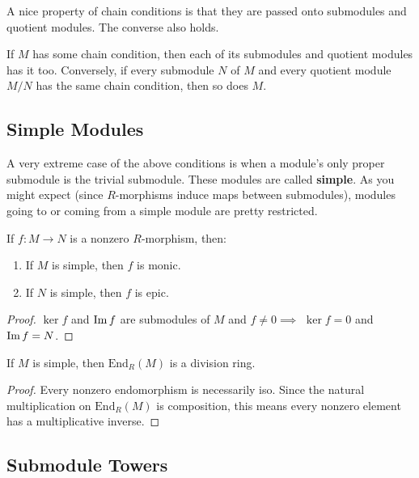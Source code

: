 \documentclass[twoside,10pt]{report}
\begin{document}
A nice property of chain conditions is that they are passed onto submodules and quotient modules. The converse also holds.
\begin{prop}
If $M$ has some chain condition, then each of its submodules and quotient modules has it too. Conversely, if every submodule $N$ of $M$ and every quotient module $M/N$ has the same chain condition, then so does $M$.
\end{prop}

\subsection{Simple Modules}

A very extreme case of the above conditions is when a module's only proper submodule is the trivial submodule. These modules are called \textbf{simple}. As you might expect (since $R$-morphisms induce maps between submodules), modules going to or coming from a simple module are pretty restricted.

\begin{prop}
If $f:M\to N$ is a nonzero $R$-morphism, then:
\begin{enumerate}
	\item If $M$ is simple, then $f$ is monic.
	\item If $N$ is simple, then $f$ is epic.
\end{enumerate}
\end{prop}
\begin{proof}
	$\ker f$ and $\operatorname{Im} f$ are submodules of $M$ and $f \neq 0 \implies $ $\ker f=0$ and $\operatorname{Im} f = N$.
\end{proof}

\begin{cor}[Schur]
	If $M$ is simple, then $\text{End}_{R}(M)$ is a division ring.
\end{cor}
\begin{proof}
	Every nonzero endomorphism is necessarily iso. Since the natural multiplication on $\text{End}_{R}(M)$ is composition, this means every nonzero element has a multiplicative inverse.
\end{proof}

\subsection{Submodule Towers}

\end{document}
